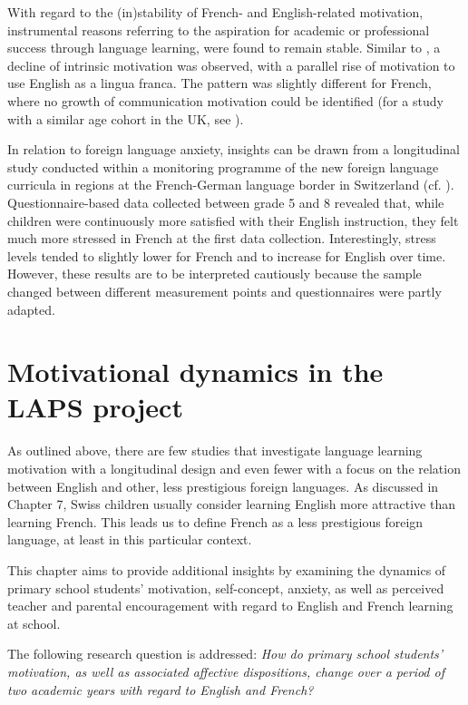 \documentclass[output=paper]{langsci/langscibook}
\begin{document}
With regard to the (in)stability of French- and English-related motivation, instrumental reasons referring to the aspiration for academic or professional success through language learning, were found to remain stable. Similar to \citet{Heinzmann2013}, a decline of intrinsic motivation was observed, with a parallel rise of motivation to use English as a lingua franca. The pattern was slightly different for French, where no growth of communication motivation could be identified (for a study with a similar age cohort in the UK, see \citealt{GrahamEtAl2016}).

In relation to foreign language anxiety, insights can be drawn from a longitudinal study conducted within a monitoring programme of the new foreign language curricula in regions at the French-German language border in Switzerland (cf. \citealt{SinghElmiger2017}). Questionnaire-based data collected between grade 5 and 8 revealed that, while children were continuously more satisfied with their English instruction, they felt much more stressed in French at the first data collection. Interestingly, stress levels tended to slightly lower for French and to increase for English over time. However, these results are to be interpreted cautiously because the sample changed between different measurement points and questionnaires were partly adapted.

\section{Motivational dynamics in the LAPS project}\label{sec:08:3}

As outlined above, there are few studies that investigate language learning motivation with a longitudinal design and even fewer with a focus on the relation between English and other, less prestigious foreign languages. As discussed in Chapter 7, Swiss children usually consider learning English more attractive than learning French. This leads us to define French as a less prestigious foreign language, at least in this particular context.

This chapter aims to provide additional insights by examining the dynamics of primary school students’ motivation, self-concept, anxiety, as well as perceived teacher and parental encouragement with regard to English and French learning at school.

The following research question is addressed: \textit{How do primary school students’ motivation, as well as associated affective dispositions, change over a period of two academic years with regard to English and French?}
\end{document}

